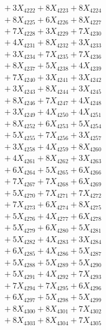 \documentclass[a4paper,10pt]{article}
\begin{document}
{\begin{align}
&\;  + 3 X_{4222} + 8 X_{4223} + 8 X_{4224} \\[0.3ex]
&\;  + 8 X_{4225} + 6 X_{4226} + 8 X_{4227} \\[0.3ex]
&\;  + 7 X_{4228} + 3 X_{4229} + 7 X_{4230} \\[0.3ex]
&\;  + 4 X_{4231} + 8 X_{4232} + 3 X_{4233} \\[0.3ex]
&\;  + 3 X_{4234} + 7 X_{4235} + 7 X_{4236} \\[0.3ex]
&\;  + 8 X_{4237} + 5 X_{4238} + 4 X_{4239} \\[0.5ex]\allowbreak
&\;  + 7 X_{4240} + 3 X_{4241} + 3 X_{4242} \\[0.3ex]
&\;  + 3 X_{4243} + 8 X_{4244} + 3 X_{4245} \\[0.3ex]
&\;  + 8 X_{4246} + 7 X_{4247} + 4 X_{4248} \\[0.3ex]
&\;  + 3 X_{4249} + 4 X_{4250} + 4 X_{4251} \\[0.3ex]
&\;  + 8 X_{4252} + 6 X_{4253} + 5 X_{4254} \\[0.3ex]
&\;  + 5 X_{4255} + 7 X_{4256} + 3 X_{4257} \\[0.3ex]
&\;  + 3 X_{4258} + 4 X_{4259} + 8 X_{4260} \\[0.3ex]
&\;  + 4 X_{4261} + 8 X_{4262} + 3 X_{4263} \\[0.3ex]
&\;  + 6 X_{4264} + 5 X_{4265} + 6 X_{4266} \\[0.3ex]
&\;  + 7 X_{4267} + 7 X_{4268} + 6 X_{4269} \\[0.5ex]\allowbreak
&\;  + 5 X_{4270} + 7 X_{4271} + 7 X_{4272} \\[0.3ex]
&\;  + 7 X_{4273} + 6 X_{4274} + 8 X_{4275} \\[0.3ex]
&\;  + 5 X_{4276} + 4 X_{4277} + 6 X_{4278} \\[0.3ex]
&\;  + 5 X_{4279} + 6 X_{4280} + 5 X_{4281} \\[0.3ex]
&\;  + 5 X_{4282} + 4 X_{4283} + 3 X_{4284} \\[0.3ex]
&\;  + 6 X_{4285} + 4 X_{4286} + 5 X_{4287} \\[0.3ex]
&\;  + 5 X_{4288} + 5 X_{4289} + 5 X_{4290} \\[0.3ex]
&\;  + 5 X_{4291} + 4 X_{4292} + 7 X_{4293} \\[0.3ex]
&\;  + 7 X_{4294} + 7 X_{4295} + 6 X_{4296} \\[0.3ex]
&\;  + 6 X_{4297} + 5 X_{4298} + 5 X_{4299} \\[0.5ex]\allowbreak
&\;  + 8 X_{4300} + 8 X_{4301} + 7 X_{4302} \\[0.3ex]
&\;  + 8 X_{4303} + 8 X_{4304} + 7 X_{4305} \\[0.3ex]

\end{align}}
\end{document}
